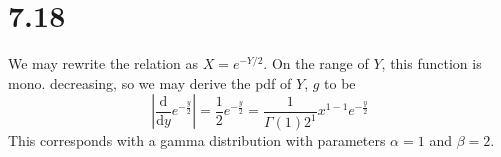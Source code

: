 \documentclass{article}
\begin{document}
\section*{7.18}
We may rewrite the relation as $X = e^{-{Y}/{2}}$. On the range of $Y$, this function is mono. decreasing, so we may derive the pdf of $Y$, $g$ to be
$$\left\lvert\frac{\mathrm{d}}{\mathrm{d}y}e^{-\frac{y}{2}}\right\rvert = \frac{1}{2}e^{-\frac{y}{2}} = \frac{1}{\Gamma(1)2^1}x^{1-1}e^{-\frac{y}{2}}$$
This corresponds with a gamma distribution with parameters $\alpha = 1$ and $\beta = 2$.
\end{document}
